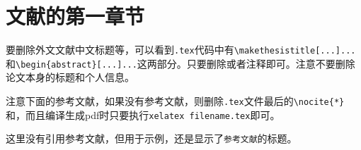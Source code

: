 \documentclass[translation]{ecustbachelorthesis}
\begin{document}
\docinit
\makethesistitle\makemyinfo
\makethesistitle[外文文献中文标题]\makemyinfo[外文文献作者]
\begin{abstract}[外文文献的关键词]
以上的外文文献中文标题等都是可选，具体删除请参考下文。文献翻译的具体格式在规范文档中也没有明确给出，该模板按照论文正文格式排版。
\end{abstract}
\section{文献的第一章节}
要删除外文文献中文标题等，可以看到\verb$.tex$代码中有\verb$\makethesistitle[...]...$和\verb$\begin{abstract}[...]...$这两部分。只要删除或者注释即可。注意不要删除论文本身的标题和个人信息。

注意下面的参考文献，如果没有参考文献，则删除\verb$.tex$文件最后的\verb$\nocite{*}$和\verb$$，而且编译生成pdf时只要执行\verb$xelatex filename.tex$即可。
\nocite{*}

这里没有引用参考文献，但用于示例，还是显示了\verb$参考文献$的标题。
\end{document}
